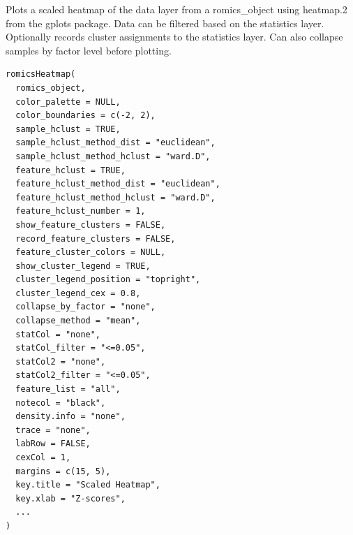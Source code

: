 \documentclass[a4paper]{book}
\begin{document}
%
\begin{Description}
Plots a scaled heatmap of the data layer from a romics\_object using heatmap.2 from the gplots package. Data can be filtered based on the statistics layer. Optionally records cluster assignments to the statistics layer. Can also collapse samples by factor level before plotting.
\end{Description}
%
\begin{Usage}
\begin{verbatim}
romicsHeatmap(
  romics_object,
  color_palette = NULL,
  color_boundaries = c(-2, 2),
  sample_hclust = TRUE,
  sample_hclust_method_dist = "euclidean",
  sample_hclust_method_hclust = "ward.D",
  feature_hclust = TRUE,
  feature_hclust_method_dist = "euclidean",
  feature_hclust_method_hclust = "ward.D",
  feature_hclust_number = 1,
  show_feature_clusters = FALSE,
  record_feature_clusters = FALSE,
  feature_cluster_colors = NULL,
  show_cluster_legend = TRUE,
  cluster_legend_position = "topright",
  cluster_legend_cex = 0.8,
  collapse_by_factor = "none",
  collapse_method = "mean",
  statCol = "none",
  statCol_filter = "<=0.05",
  statCol2 = "none",
  statCol2_filter = "<=0.05",
  feature_list = "all",
  notecol = "black",
  density.info = "none",
  trace = "none",
  labRow = FALSE,
  cexCol = 1,
  margins = c(15, 5),
  key.title = "Scaled Heatmap",
  key.xlab = "Z-scores",
  ...
)
\end{verbatim}
\end{Usage}
%
\end{document}
